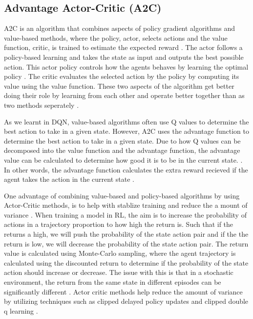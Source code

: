 \subsection{Advantage Actor-Critic (A2C)}

A2C is an algorithm that combines aspects of policy gradient algorithms and value-based methods, where the policy, actor, selects actions and the value function, critic, is trained to estimate the expected reward \cite{mnih2013playing}. The actor follows a policy-based learning and takes the state as input and outputs the best possible action. This actor policy controls how the agents behaves by learning the optimal policy \cite{SergiosKaragiannakos2018}. The critic evaluates the selected action by the policy by computing its value using the value function. These two aspects of the algorithm get better doing their role by learning from each other and operate better together than as two methods seperately \cite{SergiosKaragiannakos2018}. 

As we learnt in DQN, value-based algorithms often use Q values to determine the best action to take in a given state. However, A2C uses the advantage function to determine the best action to take in a given state. Due to how Q values can be decomposed into the value function and the advantage function, the advantage value can be calculated to determine how good it is to be in the current state. \cite{SergiosKaragiannakos2018}. In other words, the advantage function calculates the extra reward recieved if the agent takes the action in the current state \cite{ThomasSimonini2022A2C}.


One advantage of combining value-based and policy-based algorithms by using Actor-Critic methods, is to help with stablize training and reduce the a mount of variance \cite{SergiosKaragiannakos2018}. When training a model in RL, the aim is to increase the probability of actions in a trajectory proportion to how high the return is. Such that if the returns a high, we will push the probability of the state action pair and if the the return is low, we will decrease the probability of the state action pair. The return value is calculated using Monte-Carlo sampling, where the agent trajectory is calculated using the discounted return to determine if the probability of the state action should increase or decrease. The issue with this is that in a stochastic environment, the return from the same state in different episodes can be significantly different \cite{ThomasSimonini2022A2C}. Actor critic methods help reduce the amount of variance by utilizing techniques such as clipped delayed policy updates and clipped double q learning \cite{padhye2023deep}.

